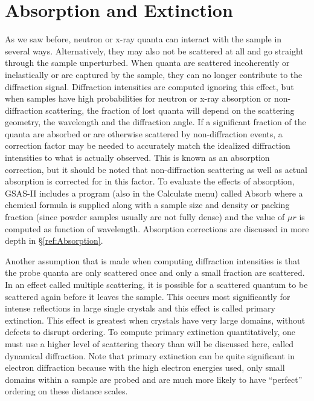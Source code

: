 \section{Absorption and Extinction}

As we saw before, neutron or x-ray quanta can interact with the sample in several ways. Alternatively, they may also not be scattered at all and go straight through the sample unperturbed. When quanta are scattered incoherently or inelastically or are captured by the sample, they can no longer contribute to the diffraction signal. Diffraction intensities are computed ignoring this effect, but when samples have high probabilities for neutron or x-ray absorption or non-diffraction scattering, the fraction of lost quanta will depend on the scattering geometry, the wavelength and the diffraction angle. If a significant fraction of the quanta are absorbed or are otherwise scattered by non-diffraction events, a correction factor may be needed to accurately match the idealized diffraction intensities to what is actually observed. This is known as an absorption correction, but it should be noted that non-diffraction scattering as well as actual absorption is corrected for in this factor. To evaluate the effects of absorption, GSAS-II includes a program (also in the Calculate menu) called Absorb where a chemical formula is supplied along with a sample size and density or packing fraction (since powder samples usually are not fully dense) and the value of $\mu r$ is computed as function of wavelength. Absorption corrections are discussed in more depth in \S\ref{ref:Absorption}.

Another assumption that is made when computing diffraction intensities is that the probe quanta are only scattered once and only a small fraction are scattered. In an effect called multiple scattering, it is possible for a scattered quantum to be scattered again before it leaves the sample. This occurs most significantly for intense reflections in large single crystals and this effect is called primary extinction. This effect is greatest when crystals have very large domains, without defects to disrupt ordering. To compute primary extinction quantitatively, one must use a higher level of scattering theory than will be discussed here, called dynamical diffraction. Note that primary extinction can be quite significant in electron diffraction because with the high electron energies used, only small domains within a sample are probed and are much more likely to have “perfect” ordering on these distance scales. 
 
